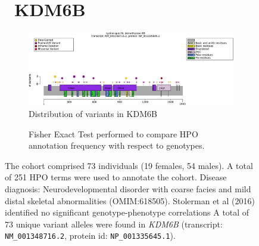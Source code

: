 \begin{figure}[htbp]
\section*{ KDM6B}
\centering
\begin{subfigure}[b]{0.95\textwidth}
\centering
\includegraphics[width=\textwidth]{ img/KDM6B_protein_diagram.pdf} 
\captionsetup{justification=raggedright,singlelinecheck=false}
\caption{Distribution of variants in KDM6B}
\end{subfigure}

\vspace{2em}

\begin{subfigure}[b]{0.95\textwidth}
\centering
{}
\captionsetup{justification=raggedright,singlelinecheck=false}
\caption{Fisher Exact Test performed to compare HPO annotation frequency with respect to genotypes. }
\end{subfigure}

\vspace{2em}

\caption{The cohort comprised 73 individuals (19 females, 54 males). A total of 251 HPO terms were used to annotate the cohort. Disease diagnosis: Neurodevelopmental disorder with coarse facies and mild distal skeletal abnormalities (OMIM:618505). Stolerman et al (2016) identified no significant genotype-phenotype correlations \cite{PMID_31124279} A total of 73 unique variant alleles were found in \textit{KDM6B} (transcript: \texttt{NM\_001348716.2}, protein id: \texttt{NP\_001335645.1}).}
\end{figure}
